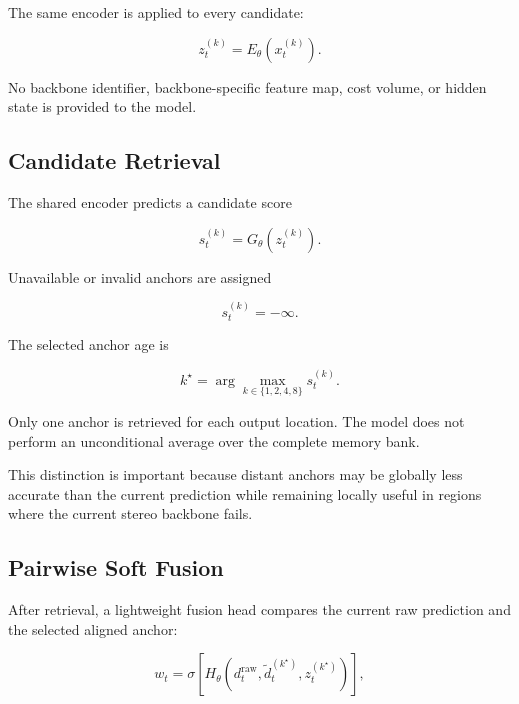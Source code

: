 \documentclass[11pt,a4paper]{article}
\begin{document}
The same encoder is applied to every candidate:

\begin{equation}
z_t^{(k)}
=
E_\theta
\left(
x_t^{(k)}
\right).
\end{equation}

No backbone identifier, backbone-specific feature map, cost volume, or
hidden state is provided to the model.

\subsection{Candidate Retrieval}
\label{sec:retrieval}

The shared encoder predicts a candidate score

\begin{equation}
s_t^{(k)}
=
G_\theta
\left(
z_t^{(k)}
\right).
\end{equation}

Unavailable or invalid anchors are assigned

\begin{equation}
s_t^{(k)}
=
-\infty.
\end{equation}

The selected anchor age is

\begin{equation}
k^\star
=
\arg\max_{k\in\{1,2,4,8\}}
s_t^{(k)}.
\label{eq:retrieval}
\end{equation}

Only one anchor is retrieved for each output location.
The model does not perform an unconditional average over the complete
memory bank.

This distinction is important because distant anchors may be globally
less accurate than the current prediction while remaining locally useful
in regions where the current stereo backbone fails.

\subsection{Pairwise Soft Fusion}
\label{sec:soft_fusion}

After retrieval, a lightweight fusion head compares the current raw
prediction and the selected aligned anchor:

\begin{equation}
w_t
=
\sigma
\left[
H_\theta
\left(
d_t^{\mathrm{raw}},
\widetilde d_t^{(k^\star)},
z_t^{(k^\star)}
\right)
\right],
\end{equation}
\end{document}
